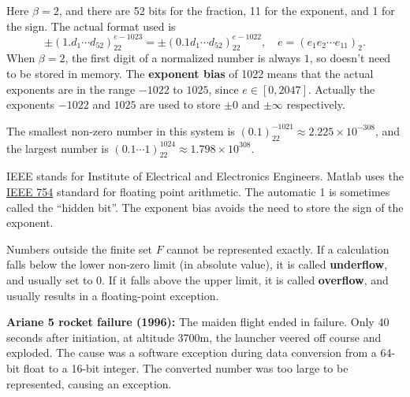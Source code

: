 \documentclass[
  letterpaper,
  DIV=11,
  numbers=noendperiod]{scrreprt}
\begin{document}
Here \(\beta=2\), and there are 52 bits for the fraction, 11 for the
exponent, and 1 for the sign. The actual format used is \[
\pm (1.d_1\cdots d_{52})_22^{e-1023} = \pm (0.1d_1\cdots d_{52})_22^{e-1022}, \quad e = (e_1e_2\cdots e_{11})_2.
\] When \(\beta=2\), the first digit of a normalized number is always
\(1\), so doesn't need to be stored in memory. The \textbf{exponent
bias} of 1022 means that the actual exponents are in the range \(-1022\)
to \(1025\), since \(e\in[0,2047]\). Actually the exponents \(-1022\)
and \(1025\) are used to store \(\pm 0\) and \(\pm\infty\) respectively.

The smallest non-zero number in this system is
\((0.1)_22^{-1021} \approx 2.225\times 10^{-308}\), and the largest
number is \((0.1\cdots 1)_22^{1024} \approx 1.798\times 10^{308}\).

\begin{tcolorbox}[enhanced jigsaw, toptitle=1mm, breakable, colbacktitle=quarto-callout-note-color!10!white, colback=white, opacitybacktitle=0.6, rightrule=.15mm, bottomrule=.15mm, left=2mm, arc=.35mm, bottomtitle=1mm, title=\textcolor{quarto-callout-note-color}{\faInfo}\hspace{0.5em}{Note}, titlerule=0mm, toprule=.15mm, leftrule=.75mm, opacityback=0, colframe=quarto-callout-note-color-frame, coltitle=black]

IEEE stands for Institute of Electrical and Electronics Engineers.
Matlab uses the \href{https://en.wikipedia.org/wiki/IEEE_754}{IEEE 754}
standard for floating point arithmetic. The automatic 1 is sometimes
called the ``hidden bit''. The exponent bias avoids the need to store
the sign of the exponent.

\end{tcolorbox}

Numbers outside the finite set \(F\) cannot be represented exactly. If a
calculation falls below the lower non-zero limit (in absolute value), it
is called \textbf{underflow}, and usually set to 0. If it falls above
the upper limit, it is called \textbf{overflow}, and usually results in
a floating-point exception.

\begin{tcolorbox}[enhanced jigsaw, toptitle=1mm, breakable, colbacktitle=quarto-callout-note-color!10!white, colback=white, opacitybacktitle=0.6, rightrule=.15mm, bottomrule=.15mm, left=2mm, arc=.35mm, bottomtitle=1mm, title=\textcolor{quarto-callout-note-color}{\faInfo}\hspace{0.5em}{Note}, titlerule=0mm, toprule=.15mm, leftrule=.75mm, opacityback=0, colframe=quarto-callout-note-color-frame, coltitle=black]

\textbf{Ariane 5 rocket failure (1996):} The maiden flight ended in
failure. Only 40 seconds after initiation, at altitude 3700m, the
launcher veered off course and exploded. The cause was a software
exception during data conversion from a 64-bit float to a 16-bit
integer. The converted number was too large to be represented, causing
an exception.

\end{tcolorbox}
\end{document}
